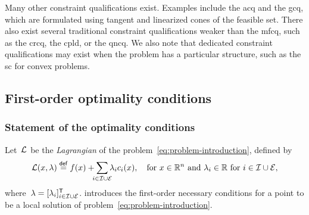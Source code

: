 Many other constraint qualifications exist.
Examples include the \gls{acq} and the \gls{gcq}, which are formulated using tangent and linearized cones of the feasible set.
There also exist several traditional constraint qualifications weaker than the \gls{mfcq}, such as the \gls{crcq}, the \gls{cpld}, or the \gls{qncq}.
We also note that dedicated constraint qualifications may exist when the problem has a particular structure, such as the \gls{sc} for convex problems.

\subsection{First-order optimality conditions}

\subsubsection{Statement of the optimality conditions}

Let~$\lag$ be the \emph{Lagrangian} of the problem~\cref{eq:problem-introduction}, defined by
\begin{equation*}
    \lag(\iter, \lm) \eqdef \obj(\iter) + \sum_{\mathclap{i \in \iub \cup \ieq}} \lm_i \con{i}(\iter), \quad \text{for~$\iter \in \R^n$ and~$\lm_i \in \R$ for~$i \in \iub \cup \ieq$},
\end{equation*}
where~$\lm = [\lm_i]_{i \in \iub \cup \ieq}^{\T}$.
 introduces the first-order necessary conditions for a point to be a local solution of problem~\cref{eq:problem-introduction}.

